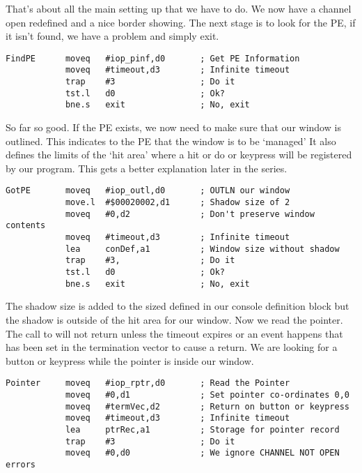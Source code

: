 That's about all the main setting up that we have to do. We now have a channel open
redefined and a nice border showing. The next stage is to look for the PE, if it isn't
found, we have a problem and simply exit.

\begin{lstlisting}[firstnumber=last,caption={Simple PE Program - Part 7}]
FindPE      moveq   #iop_pinf,d0       ; Get PE Information
            moveq   #timeout,d3        ; Infinite timeout
            trap    #3                 ; Do it
            tst.l   d0                 ; Ok?
            bne.s   exit               ; No, exit
\end{lstlisting}

So far so good. If the PE exists, we now need to make sure that our window is
outlined. This indicates to the PE that the window is to be `managed'  It also defines the
limits of the `hit area' where a hit or do or keypress will be registered by our program.
This gets a better explanation later in the series.

\begin{lstlisting}[firstnumber=last,caption={Simple PE Program - Part 8}]
GotPE       moveq   #iop_outl,d0       ; OUTLN our window
            move.l  #$00020002,d1      ; Shadow size of 2 
            moveq   #0,d2              ; Don't preserve window contents
            moveq   #timeout,d3        ; Infinite timeout
            lea     conDef,a1          ; Window size without shadow
            trap    #3,                ; Do it
            tst.l   d0                 ; Ok?
            bne.s   exit               ; No, exit
\end{lstlisting}

The shadow size is added to the sized defined in our console definition block but
the shadow is outside of the hit area for our window. Now we read the pointer. The call to
 will not return unless the timeout expires or an event happens that has been set
in the termination vector to cause a return. We are looking for a button or keypress while
the pointer is inside our window.

\begin{lstlisting}[firstnumber=last,caption={Simple PE Program - Part 9}]
Pointer     moveq   #iop_rptr,d0       ; Read the Pointer
            moveq   #0,d1              ; Set pointer co-ordinates 0,0
            moveq   #termVec,d2        ; Return on button or keypress
            moveq   #timeout,d3        ; Infinite timeout
            lea     ptrRec,a1          ; Storage for pointer record
            trap    #3                 ; Do it
            moveq   #0,d0              ; We ignore CHANNEL NOT OPEN
errors
\end{lstlisting}

